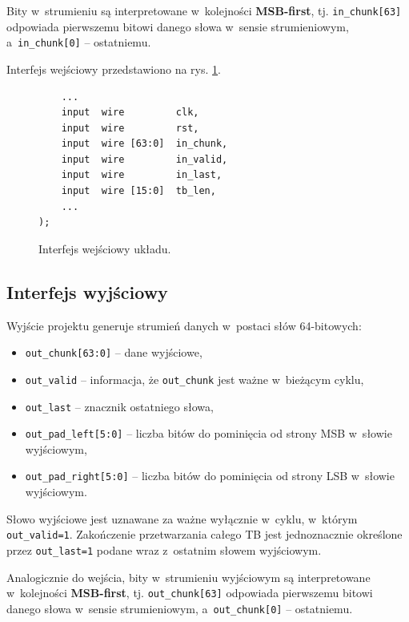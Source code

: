Bity w~strumieniu są interpretowane w~kolejności \textbf{MSB-first}, tj. \texttt{in\_chunk[63]} odpowiada pierwszemu bitowi danego słowa w~sensie strumieniowym, a~\texttt{in\_chunk[0]} -- ostatniemu.

Interfejs wejściowy przedstawiono na rys. \ref{fig:pdschtx_if_in}.

\begin{figure}[!ht]
\centering
\begin{minipage}{0.95\linewidth}
\begin{lstlisting}
    ...
    input  wire         clk,
    input  wire         rst,
    input  wire [63:0]  in_chunk,
    input  wire         in_valid,
    input  wire         in_last,
    input  wire [15:0]  tb_len,
    ...
);
\end{lstlisting}
\end{minipage}
\caption{Interfejs wejściowy układu.}
\label{fig:pdschtx_if_in}
\end{figure}





\subsection{Interfejs wyjściowy}
\label{subsec:interfejs_wyj}

Wyjście projektu generuje strumień danych w~postaci słów 64-bitowych:
\begin{itemize}
    \item \texttt{out\_chunk[63:0]} -- dane wyjściowe,
    \item \texttt{out\_valid} -- informacja, że \texttt{out\_chunk} jest ważne w~bieżącym cyklu,
    \item \texttt{out\_last} -- znacznik ostatniego słowa,
    \item \texttt{out\_pad\_left[5:0]} -- liczba bitów do pominięcia od strony MSB w~słowie wyjściowym,
    \item \texttt{out\_pad\_right[5:0]} -- liczba bitów do pominięcia od strony LSB w~słowie wyjściowym.
\end{itemize}

Słowo wyjściowe jest uznawane za ważne wyłącznie w~cyklu, w~którym \texttt{out\_valid=1}. Zakończenie przetwarzania całego TB jest jednoznacznie określone przez \texttt{out\_last=1} podane wraz z~ostatnim słowem wyjściowym.

Analogicznie do wejścia, bity w~strumieniu wyjściowym są interpretowane w~kolejności \textbf{MSB-first}, tj. \texttt{out\_chunk[63]} odpowiada pierwszemu bitowi danego słowa w~sensie strumieniowym, a~\texttt{out\_chunk[0]} -- ostatniemu.

